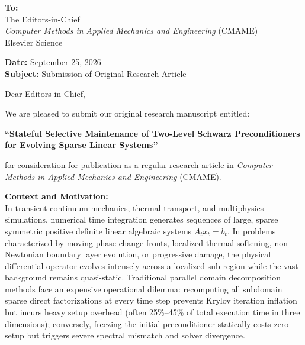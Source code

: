\documentclass[11pt,a4paper]{article}
\begin{document}
\noindent
\textbf{To:}\\
The Editors-in-Chief\\
\textit{Computer Methods in Applied Mechanics and Engineering} (CMAME)\\
Elsevier Science

\vspace{1em}
\noindent
\textbf{Date:} September 25, 2026\\
\textbf{Subject:} Submission of Original Research Article

\vspace{1.5em}
\noindent
Dear Editors-in-Chief,

\vspace{0.8em}
\noindent
We are pleased to submit our original research manuscript entitled:

\begin{center}
\large\textbf{``Stateful Selective Maintenance of Two-Level Schwarz Preconditioners\\
for Evolving Sparse Linear Systems''}
\end{center}

\noindent
for consideration for publication as a regular research article in \textit{Computer Methods in Applied Mechanics and Engineering} (CMAME).

\vspace{0.8em}
\noindent
\textbf{Context and Motivation:}\\
In transient continuum mechanics, thermal transport, and multiphysics simulations, numerical time integration generates sequences of large, sparse symmetric positive definite linear algebraic systems $A_t x_t = b_t$. In problems characterized by moving phase-change fronts, localized thermal softening, non-Newtonian boundary layer evolution, or progressive damage, the physical differential operator evolves intensely across a localized sub-region while the vast background remains quasi-static. Traditional parallel domain decomposition methods face an expensive operational dilemma: recomputing all subdomain sparse direct factorizations at every time step prevents Krylov iteration inflation but incurs heavy setup overhead (often 25\%--45\% of total execution time in three dimensions); conversely, freezing the initial preconditioner statically costs zero setup but triggers severe spectral mismatch and solver divergence.
\end{document}
